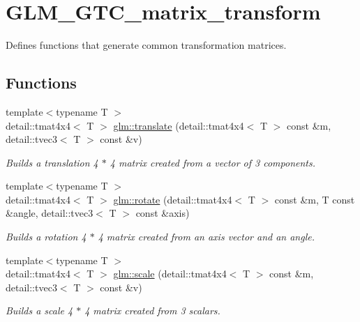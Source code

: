 \hypertarget{group__gtc__matrix__transform}{\section{G\-L\-M\-\_\-\-G\-T\-C\-\_\-matrix\-\_\-transform}
\label{group__gtc__matrix__transform}
}


Defines functions that generate common transformation matrices.  


\subsection*{Functions}
\begin{DoxyCompactItemize}
\item 
{\footnotesize template$<$typename T $>$ }\\detail\-::tmat4x4$<$ T $>$ \hyperlink{group__gtc__matrix__transform_ga8925161ecc1767957900c5ca8b922dc4}{glm\-::translate} (detail\-::tmat4x4$<$ T $>$ const \&m, detail\-::tvec3$<$ T $>$ const \&v)
\begin{DoxyCompactList}\small\item\em Builds a translation 4 $\ast$ 4 matrix created from a vector of 3 components. \end{DoxyCompactList}\item 
{\footnotesize template$<$typename T $>$ }\\detail\-::tmat4x4$<$ T $>$ \hyperlink{group__gtc__matrix__transform_gaacb9cbe8f93a8fef9dc3e25559df19c0}{glm\-::rotate} (detail\-::tmat4x4$<$ T $>$ const \&m, T const \&angle, detail\-::tvec3$<$ T $>$ const \&axis)
\begin{DoxyCompactList}\small\item\em Builds a rotation 4 $\ast$ 4 matrix created from an axis vector and an angle. \end{DoxyCompactList}\item 
{\footnotesize template$<$typename T $>$ }\\detail\-::tmat4x4$<$ T $>$ \hyperlink{group__gtc__matrix__transform_ga223e08009f1cab54651200b81e91981c}{glm\-::scale} (detail\-::tmat4x4$<$ T $>$ const \&m, detail\-::tvec3$<$ T $>$ const \&v)
\begin{DoxyCompactList}\small\item\em Builds a scale 4 $\ast$ 4 matrix created from 3 scalars. \end{DoxyCompactList}\item 

\end{DoxyCompactItemize}
